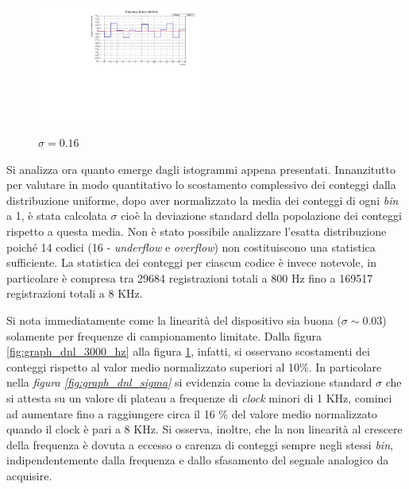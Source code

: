 \documentclass[journal]{IEEEtran}
\begin{document}
\\
\begin{figure}[H]%
\begin{center}


\caption{$\sigma = 0.16$}
\includegraphics[width=0.48\textwidth]{analysis/output/dnl_8_8000hz_bars.pdf}
\label{fig:graph_dnl_8000_hz}

\end{center}
\end{figure}

Si analizza ora quanto emerge dagli istogrammi appena presentati. Innanzitutto per valutare in modo quantitativo lo scostamento complessivo dei conteggi dalla distribuzione uniforme, dopo aver normalizzato la media dei conteggi di ogni \textit{bin} a 1, è stata calcolata $\sigma$ cioè la deviazione standard della popolazione dei conteggi rispetto a questa media. Non è stato possibile analizzare l'esatta distribuzione poiché 14 codici (16 - \textit{underflow} e \textit{overflow}) non costituiscono una statistica sufficiente. La statistica dei conteggi per ciascun codice è invece notevole, in particolare è compresa tra 29684 registrazioni totali a 800 Hz fino a 169517 registrazioni totali a 8 KHz.

Si nota immediatamente come la linearità del dispositivo sia buona ($\sigma \sim 0.03$) solamente per frequenze di campionamento limitate. Dalla figura \ref{fig:graph_dnl_3000_hz} alla figura \ref{fig:graph_dnl_8000_hz}, infatti, si osservano scostamenti dei conteggi rispetto al valor medio normalizzato superiori al 10\%.
In particolare nella \textit{figura \ref{fig:graph_dnl_sigma}} si evidenzia come la deviazione standard $\sigma$ che si attesta su un valore di plateau a frequenze di \textit{clock} minori di 1 KHz, cominci ad aumentare fino a raggiungere circa il 16 \% del valore medio normalizzato quando il clock è pari a 8 KHz. Si osserva, inoltre, che la non linearità al crescere della frequenza è dovuta a eccesso o carenza di conteggi sempre negli stessi \textit{bin}, indipendentemente dalla frequenza e dallo sfasamento del segnale analogico da acquisire.
\end{document}
